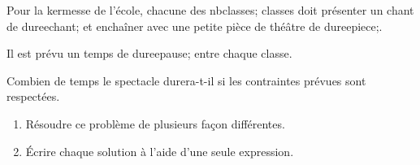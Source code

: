 \documentclass[exercice]{thedocument}%
\begin{document}
%
Pour la kermesse de l'école, chacune des \<nbclasses; classes doit présenter un
chant de \<dureechant; et enchaîner avec une petite pièce de théâtre de
\<dureepiece;. \par\noindent Il est prévu un temps de \<dureepause; entre
chaque classe.\par\noindent Combien de temps le spectacle durera-t-il si les
contraintes prévues sont respectées.
\begin{enumerate}
    \item Résoudre ce problème de plusieurs façon différentes.
    \item Écrire chaque solution à l'aide d'une seule expression.
\end{enumerate}
\end{document}
